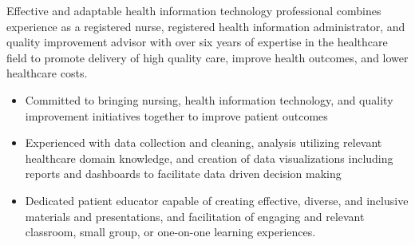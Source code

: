 

\begin{cvparagraph}

Effective and adaptable health information technology professional combines experience as a registered nurse, registered health information administrator, and quality improvement advisor with over six years of expertise in the healthcare field to promote delivery of high quality care, improve health outcomes, and lower healthcare costs.
    \begin{itemize}[topsep=0pt,itemsep=0pt,parsep=0pt,partopsep=0pt,leftmargin=4mm]
      \item Committed to bringing nursing, health information technology, and quality improvement initiatives together to improve patient outcomes    
      \item Experienced with data collection and cleaning, analysis utilizing relevant healthcare domain knowledge, and creation of data visualizations including reports and dashboards to facilitate data driven decision making
      \item Dedicated patient educator capable of creating effective, diverse, and inclusive materials and presentations, and facilitation of engaging and relevant classroom, small group, or one-on-one learning experiences.
    \end{itemize}
\end{cvparagraph}
